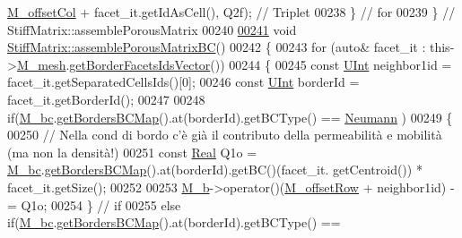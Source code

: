 \begin{DoxyCode}
      \hyperlink{classFVCode3D_1_1MatrixHandler_a6ec7cf5178c1c25b54abc46ff0affcf2}{M\_offsetCol} + facet\_it.getIdAsCell(), Q2f); \textcolor{comment}{// Triplet}
00238     \} \textcolor{comment}{// for}
00239 \} \textcolor{comment}{// StiffMatrix::assemblePorousMatrix}
00240 
\hypertarget{Stiffness_8cpp_source.tex_l00241}{}\hyperlink{classFVCode3D_1_1StiffMatrix_aee24f1b77e66c0bb7be4efbf43671c44}{00241} \textcolor{keywordtype}{void} \hyperlink{classFVCode3D_1_1StiffMatrix_aee24f1b77e66c0bb7be4efbf43671c44}{StiffMatrix::assemblePorousMatrixBC}()
00242 \{
00243     \textcolor{keywordflow}{for} (\textcolor{keyword}{auto}& facet\_it : this->\hyperlink{classFVCode3D_1_1MatrixHandler_a72f185cb557fc2e8023bd09a074f685c}{M\_mesh}.\hyperlink{classFVCode3D_1_1Rigid__Mesh_aa72b7fad937f0d1586fc10b176ef5d3e}{getBorderFacetsIdsVector}())
00244     \{
00245         \textcolor{keyword}{const} \hyperlink{namespaceFVCode3D_a4bf7e328c75d0fd504050d040ebe9eda}{UInt} neighbor1id = facet\_it.getSeparatedCellsIds()[0];
00246         \textcolor{keyword}{const} \hyperlink{namespaceFVCode3D_a4bf7e328c75d0fd504050d040ebe9eda}{UInt} borderId = facet\_it.getBorderId();
00247 
00248         \textcolor{keywordflow}{if}(\hyperlink{classFVCode3D_1_1StiffMatrix_a23e3ffc97fcf112958e9966cac41e9d3}{M\_bc}.\hyperlink{classFVCode3D_1_1BoundaryConditions_a5b53a81bdab88709fae14892bfe6a7c9}{getBordersBCMap}().at(borderId).getBCType() == 
      \hyperlink{namespaceFVCode3D_a73660061f11f1671164ce171a053f8c5a30212425b27314b01b40f4984dbf850a}{Neumann} )
00249         \{
00250             \textcolor{comment}{// Nella cond di bordo c'è già il contributo della permeabilità e mobilità (ma non la densità!)}
00251             \textcolor{keyword}{const} \hyperlink{namespaceFVCode3D_a40c1f5588a248569d80aa5f867080e83}{Real} Q1o = \hyperlink{classFVCode3D_1_1StiffMatrix_a23e3ffc97fcf112958e9966cac41e9d3}{M\_bc}.\hyperlink{classFVCode3D_1_1BoundaryConditions_a5b53a81bdab88709fae14892bfe6a7c9}{getBordersBCMap}().at(borderId).getBC()(facet\_it.
      getCentroid()) * facet\_it.getSize();
00252 
00253             \hyperlink{classFVCode3D_1_1StiffMatrix_a5bbfb34d8ef115d2806d5ded5ff109d0}{M\_b}->operator()(\hyperlink{classFVCode3D_1_1MatrixHandler_ad3faa8b15bca6e0052be8c868b924444}{M\_offsetRow} + neighbor1id) -= Q1o;
00254         \} \textcolor{comment}{// if}
00255         \textcolor{keywordflow}{else} \textcolor{keywordflow}{if}(\hyperlink{classFVCode3D_1_1StiffMatrix_a23e3ffc97fcf112958e9966cac41e9d3}{M\_bc}.\hyperlink{classFVCode3D_1_1BoundaryConditions_a5b53a81bdab88709fae14892bfe6a7c9}{getBordersBCMap}().at(borderId).getBCType() == 

\end{DoxyCode}
